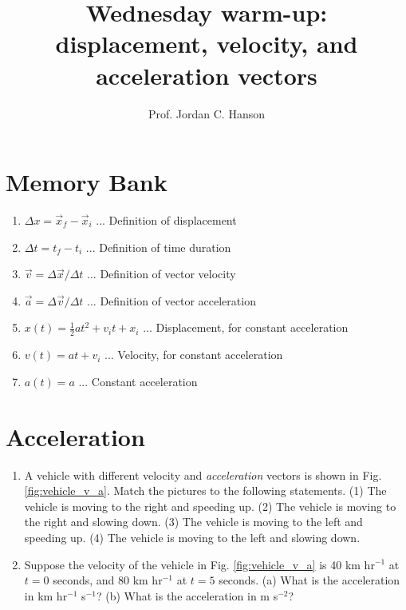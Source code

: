 \documentclass{article}
\begin{document}
\twocolumn

\title{Wednesday warm-up: displacement, velocity, and acceleration vectors}
\author{Prof. Jordan C. Hanson}

\maketitle

\section{Memory Bank}

\begin{enumerate}
\item $\Delta x = \vec{x}_f - \vec{x}_i$ ... Definition of displacement
\item $\Delta t = t_f - t_i$ ... Definition of time duration
\item $\vec{v} = \Delta \vec{x} / \Delta t$ ... Definition of vector velocity
\item $\vec{a} = \Delta \vec{v} / \Delta t$ ... Definition of vector acceleration
\item $x(t) = \frac{1}{2}at^2 + v_i t + x_i$ ... Displacement, for constant acceleration
\item $v(t) = at + v_i$ ... Velocity, for constant acceleration
\item $a(t) = a$ ... Constant acceleration
\end{enumerate}

\section{Acceleration}

\begin{enumerate}
\item A vehicle with different velocity and \textit{acceleration} vectors is shown in Fig. \ref{fig:vehicle_v_a}.  Match the pictures to the following statements.  (1) The vehicle is moving to the right and speeding up.  (2) The vehicle is moving to the right and slowing down.  (3) The vehicle is moving to the left and speeding up. (4) The vehicle is moving to the left and slowing down. \\ \vspace{0.1cm}
\item Suppose the velocity of the vehicle in Fig. \ref{fig:vehicle_v_a} is 40 km hr$^{-1}$ at $t=0$ seconds, and 80 km hr$^{-1}$ at $t=5$ seconds. (a) What is the acceleration in km hr$^{-1}$ s$^{-1}$? (b) What is the acceleration in m s$^{-2}$? \\ \vspace{2cm}
\end{enumerate}
\end{document}

